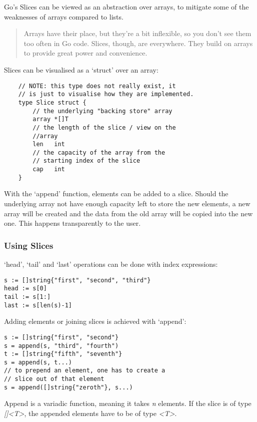 Go's Slices can be viewed as an abstraction over arrays, to mitigate some of the weaknesses of arrays
compared to lists.

\begin{quote}
    Arrays have their place, but they're a bit inflexible, so you don't see them too often in Go code.
    Slices, though, are everywhere. They build on arrays to provide great power and convenience.\autocite{golang-slices}
\end{quote}

Slices can be visualised as a `struct' over an array:

\begin{verbatim}
    // NOTE: this type does not really exist, it
    // is just to visualise how they are implemented.
    type Slice struct {
        // the underlying "backing store" array
        array *[]T
        // the length of the slice / view on the
        //array
        len   int
        // the capacity of the array from the
        // starting index of the slice
        cap   int
    }
\end{verbatim}

With the `append' function, elements can be added to a slice. Should the underlying array not have enough
capacity left to store the new elements, a new array will be created and the data from the old array will
be copied into the new one. This happens transparently to the user.

\subsubsection{Using Slices}

`head', `tail' and `last' operations can be done with index expressions:

\begin{verbatim}
s := []string{"first", "second", "third"}
head := s[0]
tail := s[1:]
last := s[len(s)-1]
\end{verbatim}

Adding elements or joining slices is achieved with `append':

\begin{verbatim}
s := []string{"first", "second"}
s = append(s, "third", "fourth")
t := []string{"fifth", "seventh"}
s = append(s, t...)
// to prepend an element, one has to create a
// slice out of that element
s = append([]string{"zeroth"}, s...)
\end{verbatim}

Append is a variadic function, meaning it takes \textit{n} elements. If the slice is of type \textit{[]<T>},
the appended elements have to be of type \textit{<T>}.

